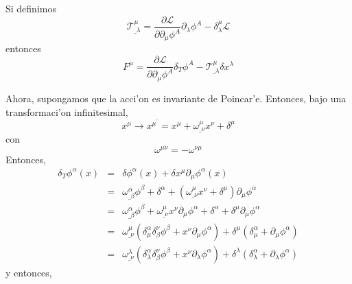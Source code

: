 Si definimos
\begin{equation}
\mathcal{T}_{\_\lambda }^{\mu }=\frac{\partial \mathcal{L}}{\partial
\partial _{\mu }\phi ^{A}}\partial _{\lambda }\phi ^{A}-\delta _{\lambda
}^{\mu }\mathcal{L}
\end{equation}
entonces
\begin{equation}
F^{\mu }=\frac{\partial \mathcal{L}}{\partial \partial _{\mu }\phi ^{A}}%
\delta _{T}\phi ^{A}-\mathcal{T}_{\_\lambda }^{\mu }\delta x^{\lambda }
\end{equation}

Ahora, supongamos que la acci'on es invariante de Poincar'e. Entonces,
bajo una transformaci'on infinitesimal,
\begin{equation}
x^{\mu }\rightarrow x^{\mu ^{\prime }}=x^{\mu }+\omega _{\_\nu }^{\mu
}x^{\nu }+\delta ^{\mu }
\end{equation}
con
\begin{equation}
\omega ^{\mu \nu }=-\omega ^{\nu \mu }
\end{equation}
Entonces,
\begin{eqnarray*}
\delta _{T}\phi ^{\alpha }(x) &=&\delta \phi ^{\alpha }\left(
x\right) +\delta x^{\mu }\partial _{\mu }\phi ^{\alpha }(x) \\
&=&\omega _{\_\beta }^{\alpha }\phi ^{\beta }+\delta ^{\alpha }+\left(
\omega _{\_\nu }^{\mu }x^{\nu }+\delta ^{\mu }\right) \partial _{\mu }\phi
^{\alpha } \\
&=&\omega _{\_\beta }^{\alpha }\phi ^{\beta }+\omega _{\_\nu }^{\mu }x^{\nu
}\partial _{\mu }\phi ^{\alpha }+\delta ^{\alpha }+\delta ^{\mu }\partial
_{\mu }\phi ^{\alpha } \\
&=&\omega _{\_\nu }^{\mu }\left( \delta _{\mu }^{\alpha }\delta _{\beta
}^{\nu }\phi ^{\beta }+x^{\nu }\partial _{\mu }\phi ^{\alpha }\right)
+\delta ^{\mu }\left( \delta _{\mu }^{\alpha }+\partial _{\mu }\phi ^{\alpha
}\right) \\
&=&\omega _{\_\nu }^{\lambda }\left( \delta _{\lambda }^{\alpha }\delta
_{\beta }^{\nu }\phi ^{\beta }+x^{\nu }\partial _{\lambda }\phi ^{\alpha
}\right) +\delta ^{\lambda }\left( \delta _{\lambda }^{\alpha }+\partial
_{\lambda }\phi ^{\alpha }\right) 
\end{eqnarray*}
y entonces,
